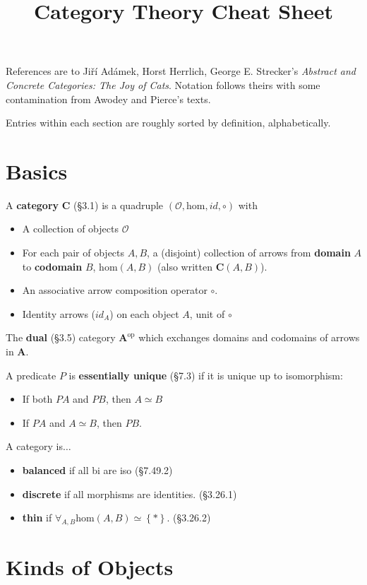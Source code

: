 \documentclass[10pt,twocolumn,letterpaper]{article}
\title{Category Theory Cheat Sheet}
\newcommand{\set}[1]{\left\{{#1}\right\}}
\newcommand{\defn}[1]{{\bf #1}}
\begin{document}
References are to Ji\v{r}\'i Ad\'amek, Horst Herrlich, George
E. Strecker's {\em Abstract and Concrete Categories: The Joy of Cats}.
Notation follows theirs with some contamination from Awodey and Pierce's
texts.

Entries within each section are roughly sorted by definition, alphabetically.

\section{Basics}

  A \defn{category} $\mathbf{C}$ (\S3.1) is a quadruple
  $(\mathcal{O},\mbox{hom},id,\circ)$ with
  \begin{itemize}
    \item A collection of objects $\mathcal{O}$
  \item For each pair of objects $A,B$, a (disjoint) collection of arrows
    from \defn{domain} $A$ to \defn{codomain} $B$,
    $\mbox{hom}(A,B)$ (also written $\mathbf{C}(A,B)$).
    \item An associative arrow composition operator $\circ$.
    \item Identity arrows ($id_A$) on each object $A$, unit of $\circ$
  \end{itemize}

  The \defn{dual} (\S3.5) category $\mathbf{A}^\text{op}$ which
    exchanges domains and codomains of arrows in $\mathbf{A}$.

  A predicate $P$ is \defn{essentially unique} (\S7.3) if it is unique up to
  isomorphism:
  \begin{itemize}
    \item If both $PA$ and $PB$, then $A \simeq B$
    \item If $PA$ and $A \simeq B$, then $PB$.
  \end{itemize}


  A category is$\dots$
  \begin{itemize}
    \item \defn{balanced} if all bi are iso (\S7.49.2)
    \item \defn{discrete} if all morphisms are identities. (\S3.26.1)
    \item \defn{thin} if $\forall_{A,B} \mbox{hom}(A,B) \simeq \set{*}$. (\S3.26.2)
  \end{itemize}

\section{Kinds of Objects}
\end{document}
